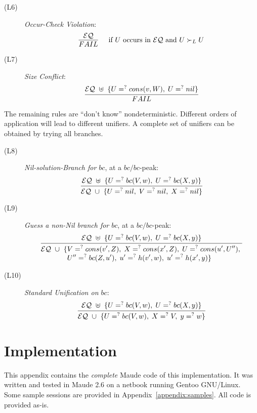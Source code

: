 \documentclass[11pt]{article}
\newcommand{\ueq}{=_{}^?}
\newcommand{\EQ}{\mathcal{EQ}}
\begin{document}
\begin{description}
    \item[(L6)] {\em Occur-Check Violation}:
        \[\infer[\quad \text{if } U \text{ occurs in } \EQ
                 \text{ and }  U \succ_L U]
            { FAIL }
            { \EQ }
        \]

    \item[(L7)] {\em Size Conflict}:
        \[\infer
            { FAIL }
            { \EQ ~ \uplus ~ \{ U \ueq cons(v, W), \; U \ueq nil \} }
        \]
\end{description}

The remaining rules are ``don't know'' nondeterministic. Different orders of
application will lead to different unifiers. A complete set of unifiers can
be obtained by trying all branches.
\begin{description}
    \item[(L8)] {\em Nil-solution-Branch for $bc$\/}, at a $bc/bc$-peak:
        \[\infer
            {\EQ ~ \cup ~ \{ U \ueq nil, \; V \ueq nil, \; X \ueq nil \}}
            {\EQ ~ \uplus ~ \{ U \ueq bc(V, w), \; U \ueq bc(X, y) \}}
        \]

    \item[(L9)] {\em Guess a non-Nil branch for $bc$\/}, at a $bc/bc$-peak:
        \[\infer
            {\begin{aligned}
                \EQ ~ \cup ~ \{
                & V \ueq cons(v', Z), \; X \ueq cons(x', Z), \;
                  U \ueq cons(u', U''), \; \\[-4pt]
                & U'' \ueq bc(Z, u'), \; u' \ueq h(v', w), \; u' \ueq h(x', y) \}
            \end{aligned}}
            {\EQ ~ \uplus ~ \{ U \ueq bc(V, w), \; U \ueq bc(X, y) \}}
        \]

    \item[(L10)] {\em Standard Unification on $bc$}:
        \[\infer
            {\EQ ~ \cup ~ \{ U \ueq bc(V, w), \; X \ueq V, \; y \ueq w \}}
            {\EQ ~ \uplus ~ \{ U \ueq bc(V, w), \; U \ueq bc(X, y) \}}
        \]
\end{description}

\newpage
\section{Implementation}\label{appendix:implementation}

This appendix contains the \emph{complete} Maude code of this implementation.
It was written and tested in Maude 2.6 on a netbook running Gentoo GNU/Linux.
Some sample sessions are provided in Appendix~\ref{appendix:samples}. All code
is provided as-is.
\end{document}

